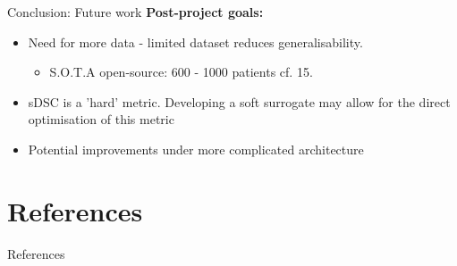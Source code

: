 \documentclass[9pt]{beamer}
\begin{document}
\begin{frame}{Conclusion: Future work}
\textbf{Post-project goals:}
\begin{itemize}
\item Need for more data - limited dataset reduces generalisability.\footnotemark[17]
\begin{itemize}
\item S.O.T.A open-source: 600 - 1000 patients cf. 15.\footnotemark[3]
\end{itemize}
\item sDSC is a 'hard' metric. Developing a soft surrogate may allow for the direct optimisation of this metric
\item Potential improvements under more complicated architecture


\end{itemize}

\end{frame}



\section{References}
\begin{frame}[t,allowframebreaks]{References} %
\printbibliography[heading=none]
\end{frame}
\end{document}
